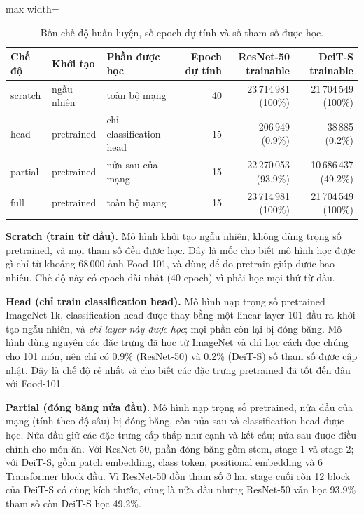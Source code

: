 \documentclass[a4paper,12pt]{article}
\begin{document}
\begin{table}[!htbp]
    \centering
    \small
    \begin{adjustbox}{max width=\linewidth}
        \begin{tabular}{lllrrr}
            \toprule
            Chế độ  & Khởi tạo   & Phần được học           & Epoch dự tính & ResNet-50 trainable   & DeiT-S trainable      \\
            \midrule
            scratch & ngẫu nhiên & toàn bộ mạng            & 40            & 23\,714\,981 (100\%)  & 21\,704\,549 (100\%)  \\
            head    & pretrained & chỉ classification head & 15            & 206\,949 (0.9\%)      & 38\,885 (0.2\%)       \\
            partial & pretrained & nửa sau của mạng        & 15            & 22\,270\,053 (93.9\%) & 10\,686\,437 (49.2\%) \\
            full    & pretrained & toàn bộ mạng            & 15            & 23\,714\,981 (100\%)  & 21\,704\,549 (100\%)  \\
            \bottomrule
        \end{tabular}
    \end{adjustbox}
    \caption{Bốn chế độ huấn luyện, số epoch dự tính và số tham số được học.}
    \label{tab:a1-modes}
\end{table}

\textbf{Scratch (train từ đầu).} Mô hình khởi tạo ngẫu nhiên, không dùng trọng số pretrained, và mọi tham số đều được học. Đây là mốc cho biết mô hình học được gì chỉ từ khoảng 68\,000 ảnh Food-101, và dùng để đo pretrain giúp được bao nhiêu. Chế độ này có epoch dài nhất (40 epoch) vì phải học mọi thứ từ đầu.

\textbf{Head (chỉ train classification head).} Mô hình nạp trọng số pretrained ImageNet-1k, classification head được thay bằng một linear layer 101 đầu ra khởi tạo ngẫu nhiên, và \emph{chỉ layer này được học}; mọi phần còn lại bị đóng băng. Mô hình dùng nguyên các đặc trưng đã học từ ImageNet và chỉ học cách đọc chúng cho 101 món, nên chỉ có 0.9\% (ResNet-50) và 0.2\% (DeiT-S) số tham số được cập nhật. Đây là chế độ rẻ nhất và cho biết các đặc trưng pretrained đã tốt đến đâu với Food-101.

\textbf{Partial (đóng băng nửa đầu).} Mô hình nạp trọng số pretrained, nửa đầu của mạng (tính theo độ sâu) bị đóng băng, còn nửa sau và classification head được học. Nửa đầu giữ các đặc trưng cấp thấp như cạnh và kết cấu; nửa sau được điều chỉnh cho món ăn. Với ResNet-50, phần đóng băng gồm stem, stage 1 và stage 2; với DeiT-S, gồm patch embedding, class token, positional embedding và 6 Transformer block đầu. Vì ResNet-50 dồn tham số ở hai stage cuối còn 12 block của DeiT-S có cùng kích thước, cùng là nửa đầu nhưng ResNet-50 vẫn học 93.9\% tham số còn DeiT-S học 49.2\%.
\end{document}
